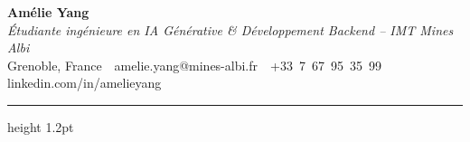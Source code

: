 \documentclass[10.5pt,a4paper]{article}
\begin{document}
\begin{center}
  {\fontsize{26}{30}\selectfont\bfseries Amélie Yang}\\[4pt]
  {\color{accent}\itshape\large Étudiante ingénieure en IA Générative \& Développement Backend -- IMT Mines Albi}\\[6pt]
  {\small
    Grenoble, France
    \,\textbullet\,
    {\color{accent}amelie.yang@mines-albi.fr}
    \,\textbullet\,
    +33~7~67~95~35~99
    \,\textbullet\,
    {\color{accent}linkedin.com/in/amelieyang}
  }
\end{center}

\vspace{3pt}
{\color{accent}\hrule height 1.2pt}
\vspace{4pt}

\setlength{\columnsep}{1.5em}
\end{document}
